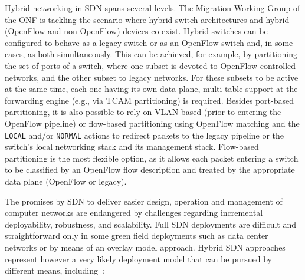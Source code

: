 Hybrid networking in SDN spans several levels. The Migration Working Group of the ONF is tackling the scenario where hybrid switch architectures and hybrid (OpenFlow and non-OpenFlow) devices 
co-exist. Hybrid switches can be configured to behave as a legacy switch or as an OpenFlow switch and, in some 
cases, as both simultaneously. This can be achieved, for example, by partitioning the set of ports of a switch, 
where one subset is devoted to OpenFlow-controlled networks, and the other subset to legacy networks. For these 
subsets to be active at the same time, each one having its own data plane, multi-table support at the forwarding 
engine (e.g., via TCAM partitioning) is required. Besides port-based partitioning, it is also possible to rely 
on VLAN-based (prior to entering the OpenFlow pipeline) or flow-based partitioning using OpenFlow matching and 
the \texttt{LOCAL} and/or \texttt{NORMAL} actions to redirect packets to the legacy pipeline or the switch's 
local networking stack and its management stack. Flow-based partitioning is the most flexible option, as it 
allows each packet entering a switch to be classified by an OpenFlow flow description and treated by the 
appropriate data plane (OpenFlow or legacy).

The promises by SDN to deliver easier design, operation and management of computer networks are endangered
by challenges regarding incremental deployability, robustness, and scalability. Full SDN deployments are 
difficult and straightforward only in some green field deployments such as data center networks or by 
means of an overlay model approach. Hybrid SDN approaches represent however a very likely deployment model 
that can be pursued by different means, including~\cite{vissicchio2014}:

